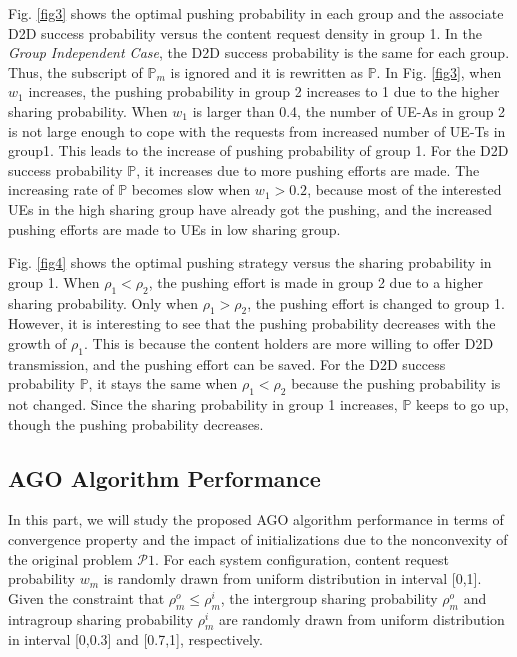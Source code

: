\documentclass[12pt, draftclsnofoot, onecolumn]{IEEEtran}
\begin{document}
Fig. \ref{fig3} shows the optimal pushing probability in each group and the associate D2D success probability versus the content request density in group 1. In the \textit{Group Independent Case}, the D2D success probability is the same for each group. Thus, the subscript of $\mathbb{P}_m$ is ignored and it is rewritten as  $\mathbb{P}$. In Fig. \ref{fig3}, when $w_1$ increases, the pushing probability in group 2 increases to 1 due to the higher sharing probability. When $w_1$ is larger than 0.4, the number of UE-As in group 2 is not large enough to cope with the requests from increased number of UE-Ts in group1. This leads to the increase of pushing probability of group 1.  For the D2D success probability $\mathbb{P}$, it increases due to more pushing efforts are made. The increasing rate of $\mathbb{P}$ becomes slow when $w_1>0.2$, because most of the interested UEs in the high sharing group have already got the pushing, and the increased pushing efforts are made to UEs in low sharing group.

Fig. \ref{fig4} shows the optimal pushing strategy versus the sharing probability in group 1. When $\rho_1 < \rho_2$, the pushing effort is made in group 2 due to a higher sharing probability. Only when $\rho_1 > \rho_2$, the pushing effort is changed to group 1. However, it is interesting to see that the pushing probability decreases with the growth of $\rho_1$. This is because the content holders are more willing to offer D2D transmission, and the pushing effort can be saved. For the D2D success probability $\mathbb{P}$, it stays the same when $\rho_1 < \rho_2$ because the pushing probability is not changed. Since the sharing probability in group 1 increases, $\mathbb{P}$ keeps to go up, though the pushing probability decreases.

\vspace{-1.0em}
\subsection{AGO Algorithm Performance}
In this part, we will study the proposed AGO algorithm performance in terms of convergence property and the impact of initializations due to the nonconvexity of the original problem $\mathcal{P}1$. For each system configuration, content request probability $w_m$ is randomly drawn from uniform distribution in interval [0,1]. Given the constraint that $\rho_m^o \leq \rho_m^i$, the intergroup sharing probability $\rho_m^o$ and intragroup sharing probability $\rho_m^i$ are randomly drawn from uniform distribution in interval [0,0.3] and [0.7,1], respectively.
\end{document}

